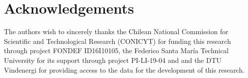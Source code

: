  \section{Acknowledgements}
The authors wish to sincerely thanks the Chilean National Commission for Scientific and Technological Research (CONICYT) for funding this research through project FONDEF ID16I10105, the Federico Santa María Technical University for its support through project PI-LI-19-04 and and the DTU Vindenergi for providing access to the data for the development of this research.